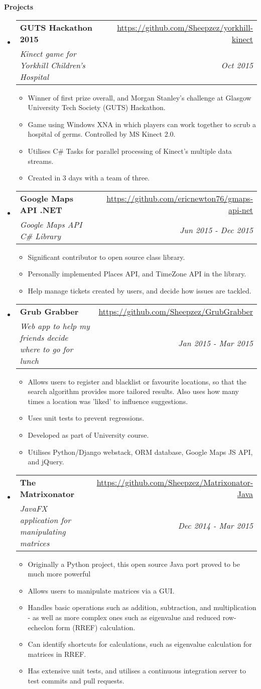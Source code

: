 \documentclass[letterpaper,11pt]{article}
\makeatletter
\newcommand{\resitem}[1]{\item #1 \vspace{-2pt}}
\newcommand{\resheading}[1]{{\large \colorbox{mygrey}{\begin{minipage}{\textwidth}{\textbf{#1 \vphantom{p\^{E}}}}\end{minipage}}}}
\newcommand{\ressubheading}[4]{
\begin{tabular*}{7.0in}{l@{\extracolsep{\fill}}r}
	\textbf{#1} & #2 \\
	\textit{#3} & \textit{#4} \\
\end{tabular*}\vspace{-6pt}}
\makeatother
\begin{document}
	\pagebreak

	\resheading{Projects}
	\begin{itemize}
		\item
		\ressubheading{GUTS Hackathon 2015}{\url{https://github.com/Sheepzez/yorkhill-kinect}}
		{Kinect game for Yorkhill Children's Hospital}{Oct 2015}
		\begin{itemize}
			\resitem{Winner of first prize overall, and Morgan Stanley's challenge at Glasgow University Tech Society (GUTS) Hackathon.}
			\resitem{Game using Windows XNA in which players can work together to scrub a hospital of germs. Controlled by MS Kinect 2.0.}
			\resitem{Utilises C\# Tasks for parallel processing of Kinect's multiple data streams.}
			\resitem{Created in 3 days with a team of three.}
		\end{itemize}

		\item
		\ressubheading{Google Maps API .NET}{\url{https://github.com/ericnewton76/gmaps-api-net}}
		{Google Maps API C\# Library}{Jun 2015 - Dec 2015}
		\begin{itemize}
			\resitem{Significant contributor to open source class library.}
			\resitem{Personally implemented Places API, and TimeZone API in the library.}
			\resitem{Help manage tickets created by users, and decide how issues are tackled.}
		\end{itemize}

		\item
		\ressubheading{Grub Grabber}{\url{https://github.com/Sheepzez/GrubGrabber}}
		{Web app to help my friends decide where to go for lunch}{Jan 2015 - Mar 2015}
		\begin{itemize}
			\resitem{Allows users to register and blacklist or favourite locations, so that the search algorithm provides more tailored results. Also uses how many times a location was 'liked' to influence suggestions.}
			\resitem{Uses unit tests to prevent regressions.}
			\resitem{Developed as part of University course.}
			\resitem{Utilises Python/Django webstack, ORM database, Google Maps JS API, and jQuery.}
		\end{itemize}

		\item
		\ressubheading{The Matrixonator}{\url{https://github.com/Sheepzez/Matrixonator-Java}}
		{JavaFX application for manipulating matrices}{Dec 2014 - Mar 2015}
		\begin{itemize}
			\resitem{Originally a Python project, this open source Java port proved to be much more powerful}
			\resitem{Allows users to manipulate matrices via a GUI.}
			\resitem{Handles basic operations such as addition, subtraction, and multiplication - as well as
			more complex ones such as eigenvalue and reduced row-echeclon form (RREF) calculation.}
			\resitem{Can identify shortcuts for calculations, such as eigenvalue calculation for matrices in RREF.}
			\resitem{Has extensive unit tests, and utilises a continuous integration server to test commits and pull requests.}
		\end{itemize}


\end{itemize}
\end{document}
